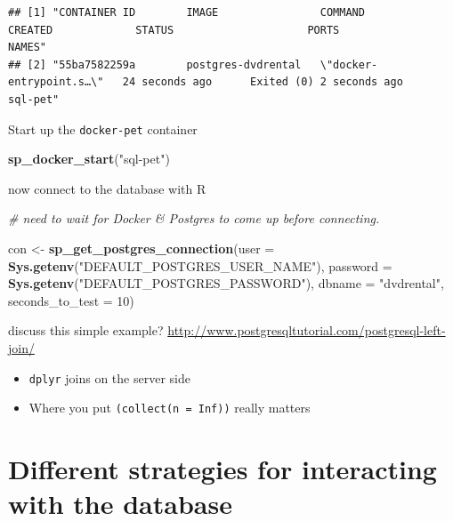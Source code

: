 \documentclass[]{book}
\newenvironment{Shaded}{\begin{snugshade}}{\end{snugshade}}
\newcommand{\CommentTok}[1]{\textcolor[rgb]{0.56,0.35,0.01}{\textit{#1}}}
\newcommand{\DataTypeTok}[1]{\textcolor[rgb]{0.13,0.29,0.53}{#1}}
\newcommand{\DecValTok}[1]{\textcolor[rgb]{0.00,0.00,0.81}{#1}}
\newcommand{\KeywordTok}[1]{\textcolor[rgb]{0.13,0.29,0.53}{\textbf{#1}}}
\newcommand{\NormalTok}[1]{#1}
\newcommand{\StringTok}[1]{\textcolor[rgb]{0.31,0.60,0.02}{#1}}
\providecommand{\tightlist}{%
  \setlength{\itemsep}{0pt}\setlength{\parskip}{0pt}}
\theoremstyle{definition}
\theoremstyle{definition}
\theoremstyle{definition}
\theoremstyle{remark}
\begin{document}
\begin{verbatim}
## [1] "CONTAINER ID        IMAGE                COMMAND                  CREATED             STATUS                     PORTS               NAMES"    
## [2] "55ba7582259a        postgres-dvdrental   \"docker-entrypoint.s…\"   24 seconds ago      Exited (0) 2 seconds ago                       sql-pet"
\end{verbatim}

Start up the \texttt{docker-pet} container

\begin{Shaded}
\begin{Highlighting}[]
\KeywordTok{sp_docker_start}\NormalTok{(}\StringTok{"sql-pet"}\NormalTok{)}
\end{Highlighting}
\end{Shaded}

now connect to the database with R

\begin{Shaded}
\begin{Highlighting}[]
\CommentTok{# need to wait for Docker & Postgres to come up before connecting.}

\NormalTok{con <-}\StringTok{ }\KeywordTok{sp_get_postgres_connection}\NormalTok{(}\DataTypeTok{user =} \KeywordTok{Sys.getenv}\NormalTok{(}\StringTok{"DEFAULT_POSTGRES_USER_NAME"}\NormalTok{),}
                         \DataTypeTok{password =} \KeywordTok{Sys.getenv}\NormalTok{(}\StringTok{"DEFAULT_POSTGRES_PASSWORD"}\NormalTok{),}
                         \DataTypeTok{dbname =} \StringTok{"dvdrental"}\NormalTok{,}
                         \DataTypeTok{seconds_to_test =} \DecValTok{10}\NormalTok{)}
\end{Highlighting}
\end{Shaded}

discuss this simple example?
\url{http://www.postgresqltutorial.com/postgresql-left-join/}

\begin{itemize}
\tightlist
\item
  \texttt{dplyr} joins on the server side
\item
  Where you put \texttt{(collect(n\ =\ Inf))} really matters
\end{itemize}

\hypertarget{different-strategies-for-interacting-with-the-database}{%
\section{Different strategies for interacting with the
database}\label{different-strategies-for-interacting-with-the-database}}
\end{document}
